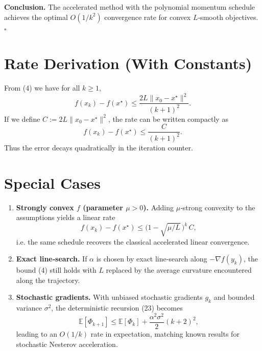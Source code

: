\documentclass{article}
\newcommand{\E}{\mathbb{E}}
\begin{document}
\noindent\textbf{Conclusion.} The accelerated method with the polynomial momentum schedule achieves the optimal $O(1/k^{2})$ convergence rate for convex $L$‑smooth objectives. $\square$

\section*{Rate Derivation (With Constants)}
From (4) we have for all $k\ge1$,
\[
f(x_k)-f(x^{\star})
\le \frac{2L\|x_0-x^{\star}\|^{2}}{(k+1)^{2}}.
\]
If we define $C:=2L\|x_0-x^{\star}\|^{2}$, the rate can be written compactly as
\[
f(x_k)-f(x^{\star})\le \frac{C}{(k+1)^{2}}.
\]
Thus the error decays quadratically in the iteration counter.

\section*{Special Cases}
\begin{enumerate}[label=\textbf{S\arabic*:}, leftmargin=*]
\item \textbf{Strongly convex $f$ (parameter $\mu>0$).}  
   Adding $\mu$‑strong convexity to the assumptions yields a linear rate
   \[
   f(x_k)-f(x^{\star})\le \bigl(1-\sqrt{\mu/L}\,\bigr)^{k}\,C,
   \]
   i.e. the same schedule recovers the classical accelerated linear convergence.
\item \textbf{Exact line‑search.}  
   If $\alpha$ is chosen by exact line‑search along $-\nabla f(y_k)$, the bound (4) still holds with $L$ replaced by the average curvature encountered along the trajectory.
\item \textbf{Stochastic gradients.}  
   With unbiased stochastic gradients $g_k$ and bounded variance $\sigma^{2}$, the deterministic recursion (23) becomes
   \[
   \E[\Phi_{k+1}] \le \E[\Phi_k] + \frac{\alpha^{2}\sigma^{2}}{2}(k+2)^{2},
   \]
   leading to an $O(1/k)$ rate in expectation, matching known results for stochastic Nesterov acceleration.
\end{enumerate}
\end{document}
